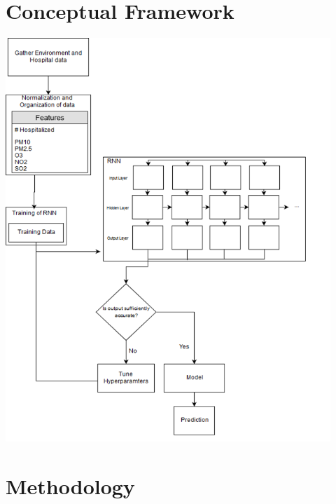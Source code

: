\documentclass[10pt,11pt,12pt,oneside]{book}
\begin{document}
\section{Conceptual Framework}
\includegraphics[height=6in]{conframework.png}
\section{Methodology}
\end{document}
